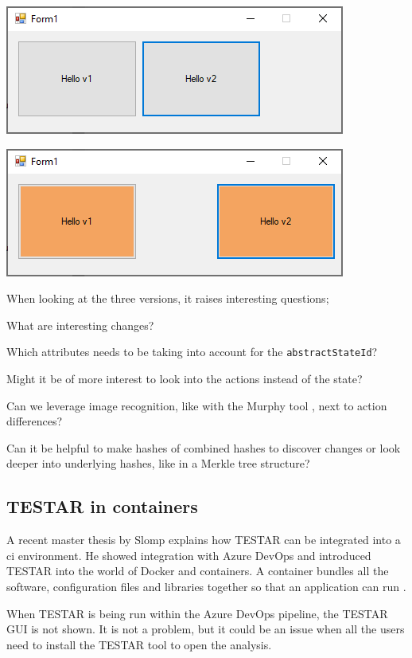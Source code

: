 \begingroup
\captionsetup{type=figure}
\includegraphics[scale=1]{pics/exp-v2.png}
\label{fig:exp-v2}
\endgroup

\begingroup
\captionsetup{type=figure}
\includegraphics[scale=1]{pics/exp-v3.png}
\label{fig:exp-v3}
\endgroup

When looking at the three versions, it raises interesting questions; 

What are interesting changes? 

Which attributes needs to be taking into account for the \verb|abstractStateId|? 

Might it be of more interest to look into the actions instead of the state? 

Can we leverage image recognition, like with the Murphy tool \cite{murphy-extract-gui}, next to action differences? 

Can it be helpful to make hashes of combined hashes to discover changes or look deeper into underlying hashes, like in a Merkle tree \cite{merkle-tree} structure?

\subsection{TESTAR in containers}
A recent master thesis by Slomp explains how TESTAR can be integrated into a \acrfull{ci} environment. He showed integration with Azure DevOps and introduced TESTAR into the world of Docker and containers. A container bundles all the software, configuration files and libraries together so that an application can run \cite{ms-container}. 

When TESTAR is being run within the Azure DevOps pipeline, the TESTAR GUI is not shown. It is not a problem, but it could be an issue when all the users need to install the TESTAR tool to open the analysis.  